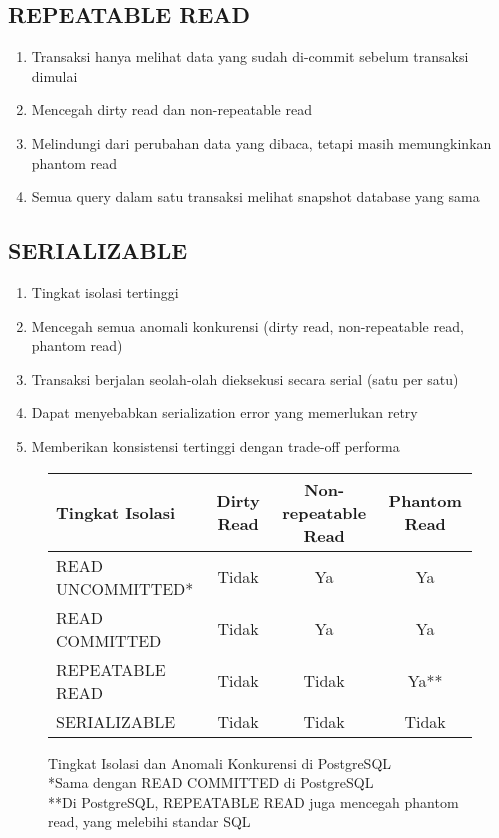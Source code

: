 \subsection{REPEATABLE READ}
\begin{enumerate}
    \item Transaksi hanya melihat data yang sudah di-commit sebelum transaksi dimulai
    \item Mencegah dirty read dan non-repeatable read
    \item Melindungi dari perubahan data yang dibaca, tetapi masih memungkinkan phantom read
    \item Semua query dalam satu transaksi melihat snapshot database yang sama
\end{enumerate}

\subsection{SERIALIZABLE}
\begin{enumerate}
    \item Tingkat isolasi tertinggi
    \item Mencegah semua anomali konkurensi (dirty read, non-repeatable read, phantom read)
    \item Transaksi berjalan seolah-olah dieksekusi secara serial (satu per satu)
    \item Dapat menyebabkan serialization error yang memerlukan retry
    \item Memberikan konsistensi tertinggi dengan trade-off performa
\end{enumerate}

\begin{figure}[h]
	\centering
	\begin{tabular}{|l|c|c|c|}
		\hline
		\textbf{Tingkat Isolasi} & \textbf{Dirty Read} & \textbf{Non-repeatable Read} & \textbf{Phantom Read} \\
		\hline
		READ UNCOMMITTED* & Tidak & Ya & Ya \\
		\hline
		READ COMMITTED & Tidak & Ya & Ya \\
		\hline
		REPEATABLE READ & Tidak & Tidak & Ya** \\
		\hline
		SERIALIZABLE & Tidak & Tidak & Tidak \\
		\hline
	\end{tabular}
	\caption{Tingkat Isolasi dan Anomali Konkurensi di PostgreSQL\\
	*Sama dengan READ COMMITTED di PostgreSQL\\
	**Di PostgreSQL, REPEATABLE READ juga mencegah phantom read, yang melebihi standar SQL}
\end{figure}

